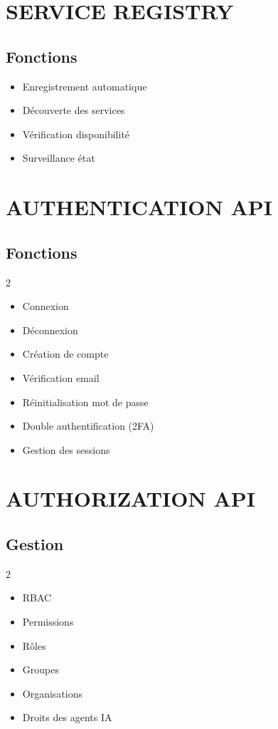 \documentclass[12pt,a4paper,oneside]{book}
\begin{document}
\chapter{SERVICE REGISTRY}

\section{Fonctions}
\begin{itemize}
\item Enregistrement automatique
\item Découverte des services
\item Vérification disponibilité
\item Surveillance état
\end{itemize}

\chapter{AUTHENTICATION API}

\section{Fonctions}
\begin{multicols}{2}
\begin{itemize}
\item Connexion
\item Déconnexion
\item Création de compte
\item Vérification email
\item Réinitialisation mot de passe
\item Double authentification (2FA)
\item Gestion des sessions
\end{itemize}
\end{multicols}

\chapter{AUTHORIZATION API}

\section{Gestion}
\begin{multicols}{2}
\begin{itemize}
\item RBAC
\item Permissions
\item Rôles
\item Groupes
\item Organisations
\item Droits des agents IA
\end{itemize}
\end{multicols}
\end{document}
